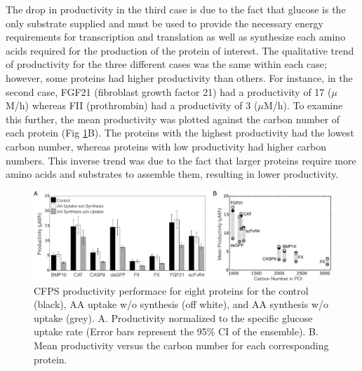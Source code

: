 \documentclass[journal=asbcd6,manuscript=article]{achemso}
\begin{document}
The drop in productivity in the third case is due to the fact that glucose is the only substrate supplied and must be used to provide the necessary energy requirements for transcription and translation as well as synthesize each amino acids required for the production of the protein of interest.  
The qualitative trend of productivity for the three different cases was the same within each case; however, some proteins had higher productivity than others.
For instance, in the second case, FGF21 (fibroblast growth factor 21) had a productivity of 17 ($\mu$M/h) whereas FII (prothrombin) had a productivity of 3 ($\mu$M/h).
To examine this further, the mean productivity was plotted against the carbon number of each protein (Fig \ref{fig:Prod_POI}B).
The proteins with the highest productivity had the lowest carbon number, whereas proteins with low productivity had higher carbon numbers.
This inverse trend was due to the fact that larger proteins require more amino acids and substrates to assemble them, resulting in lower productivity.
\begin{figure}[t!]
\centering
\includegraphics[width=1.00\textwidth]{./Figures/Prod_POI.pdf}
\caption{CFPS productivity performace for eight proteins for the control (black), AA uptake w/o synthesis (off white), and AA synthesis w/o uptake (grey). A. Productivity normalized to the specific glucose uptake rate (Error bars represent the 95\% CI of the ensemble). B. Mean productivity versus the carbon number for each corresponding protein.}
\label{fig:Prod_POI}
\end{figure}
\end{document}
